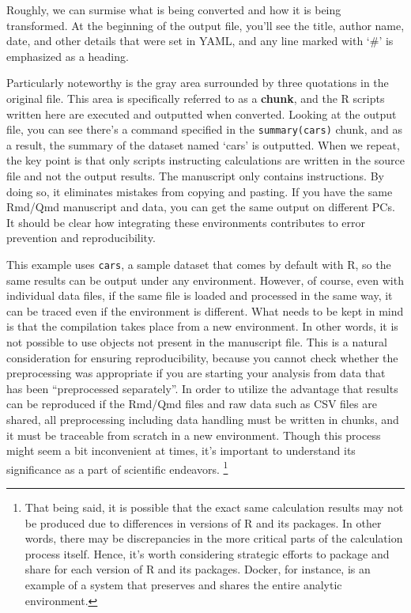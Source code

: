 \documentclass[
  a4paper,
]{book}
\begin{document}
Roughly, we can surmise what is being converted and how it is being
transformed. At the beginning of the output file, you'll see the title,
author name, date, and other details that were set in YAML, and any line
marked with `\#' is emphasized as a heading.

Particularly noteworthy is the gray area surrounded by three quotations
in the original file. This area is specifically referred to as a
\textbf{chunk}, and the R scripts written here are executed and
outputted when converted. Looking at the output file, you can see
there's a command specified in the \texttt{summary(cars)} chunk, and as
a result, the summary of the dataset named `cars' is outputted. When we
repeat, the key point is that only scripts instructing calculations are
written in the source file and not the output results. The manuscript
only contains instructions. By doing so, it eliminates mistakes from
copying and pasting. If you have the same Rmd/Qmd manuscript and data,
you can get the same output on different PCs. It should be clear how
integrating these environments contributes to error prevention and
reproducibility.

This example uses \texttt{cars}, a sample dataset that comes by default
with R, so the same results can be output under any environment.
However, of course, even with individual data files, if the same file is
loaded and processed in the same way, it can be traced even if the
environment is different. What needs to be kept in mind is that the
compilation takes place from a new environment. In other words, it is
not possible to use objects not present in the manuscript file. This is
a natural consideration for ensuring reproducibility, because you cannot
check whether the preprocessing was appropriate if you are starting your
analysis from data that has been ``preprocessed separately''. In order
to utilize the advantage that results can be reproduced if the Rmd/Qmd
files and raw data such as CSV files are shared, all preprocessing
including data handling must be written in chunks, and it must be
traceable from scratch in a new environment. Though this process might
seem a bit inconvenient at times, it's important to understand its
significance as a part of scientific endeavors. \footnote{That being
  said, it is possible that the exact same calculation results may not
  be produced due to differences in versions of R and its packages. In
  other words, there may be discrepancies in the more critical parts of
  the calculation process itself. Hence, it's worth considering
  strategic efforts to package and share for each version of R and its
  packages. Docker, for instance, is an example of a system that
  preserves and shares the entire analytic environment.}
\end{document}
